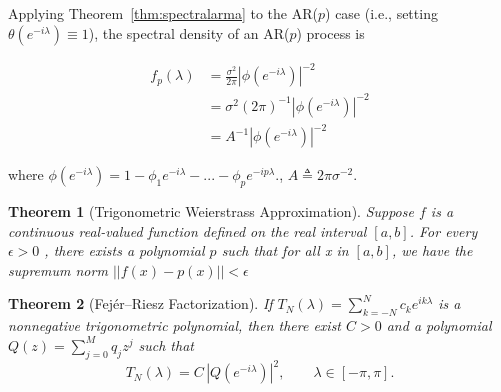 \documentclass[preprint]{aastex}
\theoremstyle{nonitalicname}
\newtheorem{theorem}{Theorem}[section]
\theoremstyle{plain}
\theoremstyle{remark}
\begin{document}
Applying Theorem~\ref{thm:spectralarma} to the AR($p$) case (i.e., setting $\theta(e^{-i\lambda}) \equiv 1$), the spectral density of an AR($p$) process is

\begin{equation} \label{eq:ar_spectral_density}
\begin{aligned}
f_p(\lambda) &= \frac{\sigma^2}{2\pi} |\phi(e^{-i\lambda})|^{-2}\\
&= \sigma^2 (2\pi)^{-1} |\phi(e^{-i\lambda})|^{-2}\\
&= A^{-1}|\phi(e^{-i\lambda})|^{-2}
\end{aligned}
\end{equation}

where $\phi(e^{-i\lambda})
= 1 - \phi_1 e^{-i\lambda}
    - ...
    - \phi_p e^{-ip\lambda}.$, $A \triangleq 2\pi \sigma^{-2}$.

\begin{theorem}[Trigonometric Weierstrass Approximation]\label{lem:weierstrass}
Suppose $f$ is a continuous real-valued function defined on the real interval $[a,b]$. For every $\epsilon >0$  , there exists a polynomial $p$ such that for all x in $[a,b]$, we have the supremum norm $||f(x)-p(x)|| < \epsilon$
\end{theorem}

\begin{theorem}[Fej\'er--Riesz Factorization]\label{lem:fejer}
If $T_N(\lambda)=\sum_{k=-N}^{N}c_k e^{ik\lambda}$ is a nonnegative
trigonometric polynomial, then there exist $C>0$ and a polynomial
$Q(z)=\sum_{j=0}^M q_j z^j$ such that 
$$T_N(\lambda)=C\,|Q(e^{-i\lambda})|^2,\qquad \lambda\in[-\pi,\pi].$$
\end{theorem}
\end{document}
